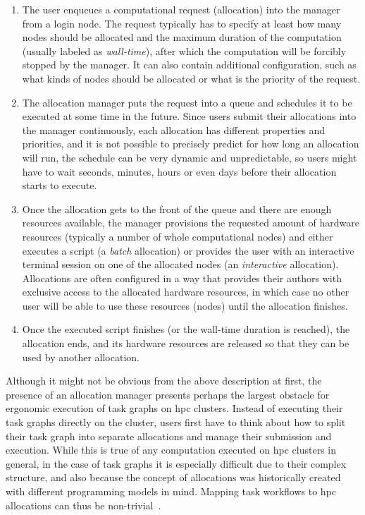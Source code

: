 \begin{enumerate}[itemsep=0pt,topsep=4pt]
	\item The user enqueues a computational request (allocation) into the manager from a login node. The
	      request typically has to specify at least how many nodes should be allocated and the maximum
	      duration of the computation (usually labeled as \emph{wall-time}), after which the
	      computation will be forcibly stopped by the manager. It can also contain additional configuration,
	      such as what kinds of nodes should be allocated or what is the priority of the request.
	\item The allocation manager puts the request into a queue and schedules it to be executed at some time
	      in the future. Since users submit their allocations into the manager continuously, each allocation
	      has different properties and priorities, and it is not possible to precisely predict for how long
	      an allocation will run, the schedule can be very dynamic and unpredictable, so users might have to
	      wait seconds, minutes, hours or even days before their allocation starts to execute.
	\item Once the allocation gets to the front of the queue and there are enough resources available, the
	      manager provisions the requested amount of hardware resources (typically a number of whole
	      computational nodes) and either executes a script (a \emph{batch} allocation) or provides
	      the user with an interactive terminal session on one of the allocated nodes (an
	      \emph{interactive} allocation). Allocations are often configured in a way that provides their
	      authors with exclusive access to the allocated hardware resources, in which case no other user will
	      be able to use these resources (nodes) until the allocation finishes.
	\item Once the executed script finishes (or the wall-time duration is reached), the allocation ends, and
	      its hardware resources are released so that they can be used by another allocation.
\end{enumerate}

Although it might not be obvious from the above description at first, the presence of an allocation
manager presents perhaps the largest obstacle for ergonomic execution of task graphs on
\gls{hpc} clusters. Instead of executing their task graphs directly on the cluster,
users first have to think about how to split their task graph into separate allocations and manage
their submission and execution. While this is true of any computation executed on
\gls{hpc} clusters in general, in the case of task graphs it is especially difficult
due to their complex structure, and also because the concept of allocations was historically
created with different programming models in mind. Mapping task workflows to
\gls{hpc} allocations can thus be non-trivial~\cite{glume,slurm-workflow}.

